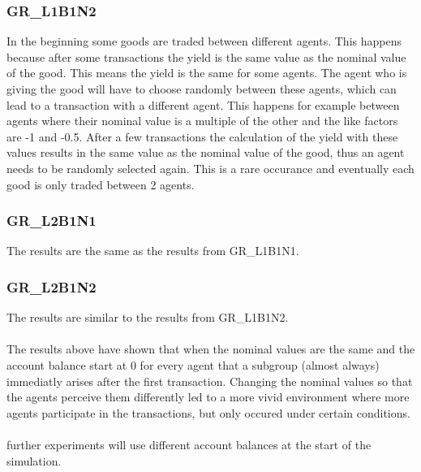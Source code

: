 \documentclass[twoside,openright]{uva-bachelor-thesis}
\begin{document}
\subsubsection{GR\_L1B1N2}
In the beginning some goods are traded between different agents. This happens because after some transactions the yield is the same value as the nominal value of the good. This means the yield is the same for some agents. The agent who is giving the good will have to choose randomly between these agents, which can lead to a transaction with a different agent. This happens for example between agents where their nominal value is a multiple of the other and the like factors are -1 and -0.5. After a few transactions the calculation of the yield with these values results in the same value as the nominal value of the good, thus an agent needs to be randomly selected again. This is a rare occurance and eventually each good is only traded between 2 agents.
\subsubsection{GR\_L2B1N1}
The results are the same as the results from GR\_L1B1N1.
\subsubsection{GR\_L2B1N2}
The results are similar to the results from GR\_L1B1N2. 
\\
\\
The results above have shown that when the nominal values are the same and the account balance start at 0 for every agent that a subgroup (almost always) immediatly arises after the first transaction. Changing the nominal values so that the agents perceive them differently led to a more vivid environment where more agents participate in the transactions, but only occured under certain conditions. 
\\
\\
further experiments will use different account balances at the start of the simulation.
\end{document}
